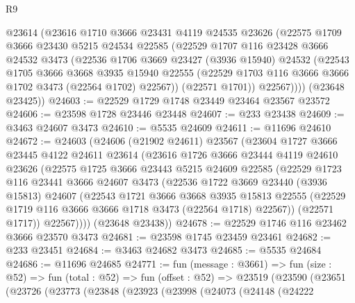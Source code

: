 \begin{lexlean}{R9}
\begin{coremodule}
        @23614
        (@23616
          @1710
          @3666
          @23431
          @4119
          @24535
          @23626
          (@22575
            @1709
            @3666
            @23430
            @5215
            @24534
            @22585
            (@22529
              @1707
              @116
              @23428
              @3666
              @24532
              @3473
              (@22536
                @1706
                @3669
                @23427
                (@3936 @15940)
                @24532
                (@22543
                  @1705
                  @3666
                  @3668
                  @3935
                  @15940
                  @22555
                  (@22529 @1703 @116 @3666 @3666 @1702 @3473 (@22564 @1702) @22567))
                (@22571 @1701))
              @22567))))
      (@23648 @23425))
@24603 := @22529 @1729 @1748 @23449 @23464 @23567 @23572
@24606 := @23598 @1728 @23446 @23448
@24607 := @233 @23438
@24609 := @3463 @24607 @3473
@24610 := @5535 @24609
@24611 := @11696 @24610
@24672 := @24603
    (@24606
      (@21902 @24611)
      @23567
      (@23604
        @1727
        @3666
        @23445
        @4122
        @24611
        @23614
        (@23616
          @1726
          @3666
          @23444
          @4119
          @24610
          @23626
          (@22575
            @1725
            @3666
            @23443
            @5215
            @24609
            @22585
            (@22529
              @1723
              @116
              @23441
              @3666
              @24607
              @3473
              (@22536
                @1722
                @3669
                @23440
                (@3936 @15813)
                @24607
                (@22543
                  @1721
                  @3666
                  @3668
                  @3935
                  @15813
                  @22555
                  (@22529 @1719 @116 @3666 @3666 @1718 @3473 (@22564 @1718) @22567))
                (@22571 @1717))
              @22567))))
      (@23648 @23438))
@24678 := @22529 @1746 @116 @23462 @3666 @23570 @3473
@24681 := @23598 @1745 @23459 @23461
@24682 := @233 @23451
@24684 := @3463 @24682 @3473
@24685 := @5535 @24684
@24686 := @11696 @24685
@24771 := fun (message : @3661) =>
  fun (size : @52) =>
  fun (total : @52) =>
  fun (offset : @52) =>
  @23519
    (@23590
      (@23651
        (@23726
          (@23773
            (@23848
              (@23923
                (@23998
                  (@24073
                    (@24148
                      (@24222

\end{coremodule}
\end{lexlean}
